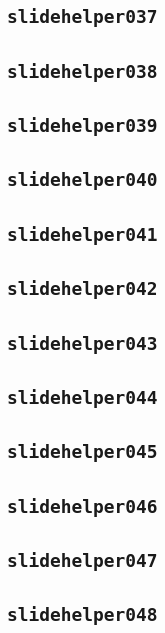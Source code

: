 \subsection{\texttt{slidehelper037}}
\newpage
\subsection{\texttt{slidehelper038}}
\newpage
\subsection{\texttt{slidehelper039}}
\newpage
\subsection{\texttt{slidehelper040}}
\newpage
\subsection{\texttt{slidehelper041}}
\newpage
\subsection{\texttt{slidehelper042}}
\newpage
\subsection{\texttt{slidehelper043}}
\newpage
\subsection{\texttt{slidehelper044}}
\newpage
\subsection{\texttt{slidehelper045}}
\newpage
\subsection{\texttt{slidehelper046}}
\newpage
\subsection{\texttt{slidehelper047}}
\newpage
\subsection{\texttt{slidehelper048}}
\newpage
